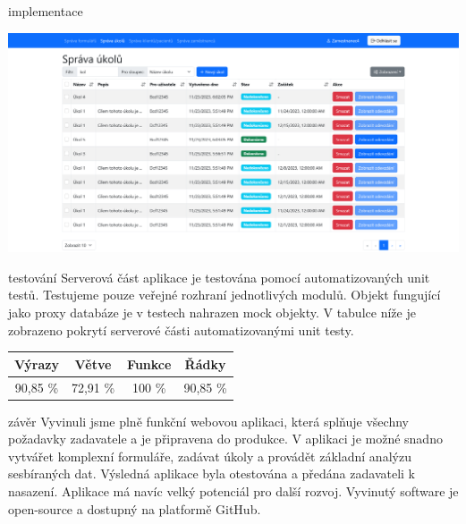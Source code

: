 \documentclass[portrait,a0paper,fontscale=0.25]{baposter}
\begin{document}
\begin{poster}
\begin{posterbox}[column=1, name=impl]{implementace}
            \begin{center}
                \includegraphics[width=\linewidth]{img/sprava-ukolu}
            \end{center}
        \end{posterbox}

        \begin{posterbox}[column=1, name=testing, below=impl]{testování}
            Serverová část aplikace je testována pomocí automatizovaných unit testů.
            Testujeme pouze veřejné rozhraní jednotlivých modulů.
            Objekt fungující jako proxy databáze je v testech nahrazen mock objekty.
            V tabulce níže je zobrazeno pokrytí serverové části automatizovanými unit testy.
            \begin{center}
                \begin{tabular}{c|c|c|c}
                    \textbf{Výrazy} & \textbf{Větve} & \textbf{Funkce} & \textbf{Řádky} \\
                    \hline
                    90,85 \%        & 72,91 \%       & 100 \%          & 90,85 \%       \\
                \end{tabular}
            \end{center}
        \end{posterbox}

        \begin{posterbox}[column=1, name=conclusion, below=testing]{závěr}
            Vyvinuli jsme plně funkční webovou aplikaci, která splňuje všechny požadavky zadavatele a je připravena do produkce.
            V aplikaci je možné snadno vytvářet komplexní formuláře, zadávat úkoly a provádět základní analýzu sesbíraných dat.
            Výsledná aplikace byla otestována a předána zadavateli k nasazení.
            Aplikace má navíc velký potenciál pro další rozvoj.
            Vyvinutý software je open-source a dostupný na platformě GitHub.
        \end{posterbox}


\end{poster}
\end{document}

